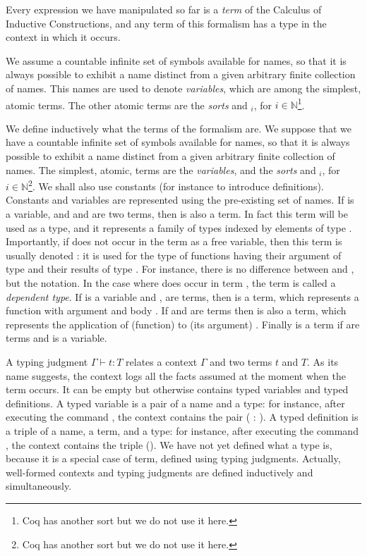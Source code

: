 Every expression we have manipulated so far is a \emph{term} of the
Calculus of Inductive Constructions, and any term of this formalism
has a type in the context in which it occurs.

We assume a countable infinite set of symbols available for names, so
that it is always possible to exhibit a name distinct from a given
arbitrary finite collection of names. This names are used to denote
\emph{variables}, which are among the simplest, atomic terms. The
other atomic terms are the \emph{sorts}  and $_i$, for
$i \in \mathbb{N}$\footnote{Coq has another sort  but we do not
  use it here.}.



We %
define
inductively what the terms of the formalism are. We suppose that we
have a countable infinite set of symbols available for names, so that it is
always possible to exhibit a name distinct from a given arbitrary
finite collection of names. The simplest, atomic, terms are the
\emph{variables}, and the \emph{sorts}  and $_i$, for
$i \in \mathbb{N}$\footnote{Coq has
another sort  but we do not use it here.}. We shall also
use constants (for instance to introduce definitions). Constants and
variables are represented using the pre-existing set of names. If  is a
variable, and  and  are two terms, then  is
also a term. In fact this term will be used as a type, and it
represents a family of types  indexed by elements of type .
Importantly, if  does not occur in the term  as a
free variable, then this term is usually denoted : it is
used for the type of functions having their argument of type  and
their results of type . For instance, there is no difference
between  and , but the
notation. In the case where  does occur in term , the term
 is called a \emph{dependent type}.
If  is a variable and , 
are terms, then  is a term, which represents a function
with argument  and body . If  and  are terms then
 is also a term, which represents the application of (function)
 to (its argument) . Finally  is a term
if  are terms and  is a variable.

A typing judgment $\Gamma \vdash t : T$ relates a
context $\Gamma$ and two terms $t$ and $T$. As its name suggests,
the context logs all the facts assumed at the moment when the term
occurs. It can be empty but otherwise contains typed variables and
typed definitions. A typed variable is a pair of a name and a
type: for instance, after executing the command ,
the context contains the pair ( : ). A typed definition is
a triple of a name, a term, and a type: for instance, after executing
the command , the context contains the
triple (). We have not yet defined what a
type is, because it is a special case of term, defined using typing
judgments. Actually, well-formed contexts and typing judgments are
defined inductively and simultaneously.


